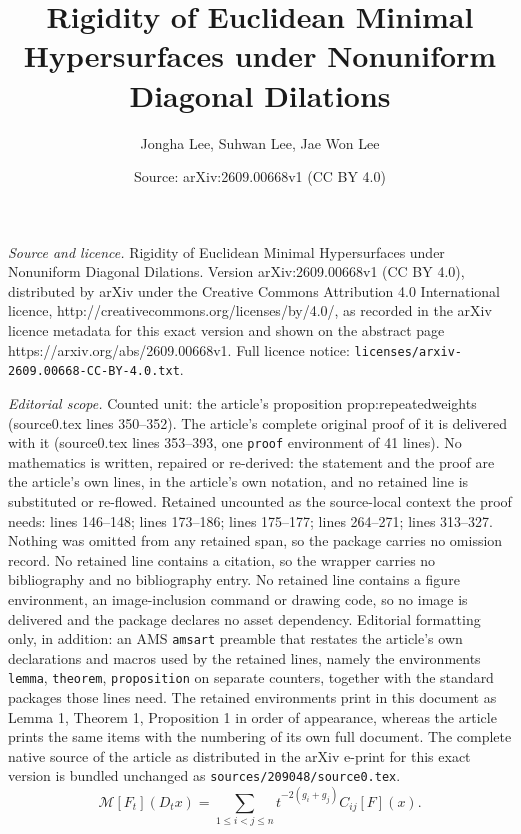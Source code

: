 \documentclass[10pt,a4paper]{amsart}
\title{Rigidity of Euclidean Minimal Hypersurfaces under Nonuniform Diagonal Dilations}
\author{Jongha Lee, Suhwan Lee, Jae Won Lee}
\date{Source: arXiv:2609.00668v1 (CC BY 4.0)}
\begin{document}
\maketitle

\noindent\emph{Source and licence.} Rigidity of Euclidean Minimal Hypersurfaces under Nonuniform Diagonal Dilations. Version arXiv:2609.00668v1 (CC BY 4.0), distributed by arXiv under the Creative Commons Attribution 4.0 International licence, http://creativecommons.org/licenses/by/4.0/, as recorded in the arXiv licence metadata for this exact version and shown on the abstract page https://arxiv.org/abs/2609.00668v1. Full licence notice: \texttt{licenses/arxiv-2609.00668-CC-BY-4.0.txt}.\par\smallskip

\noindent\textit{Editorial scope.} Counted unit: the article's proposition prop:repeatedweights (source0.tex lines 350--352). The article's complete original proof of it is delivered with it (source0.tex lines 353--393, one \texttt{proof} environment of 41 lines). No mathematics is written, repaired or re-derived: the statement and the proof are the article's own lines, in the article's own notation, and no retained line is substituted or re-flowed.  Retained uncounted as the source-local context the proof needs: lines 146--148; lines 173--186; lines 175--177; lines 264--271; lines 313--327.  Nothing was omitted from any retained span, so the package carries no omission record.  No retained line contains a citation, so the wrapper carries no bibliography and no bibliography entry.  No retained line contains a figure environment, an image-inclusion command or drawing code, so no image is delivered and the package declares no asset dependency.  Editorial formatting only, in addition: an AMS \texttt{amsart} preamble that restates the article's own declarations and macros used by the retained lines, namely the environments \texttt{lemma}, \texttt{theorem}, \texttt{proposition} on separate counters, together with the standard packages those lines need.  The retained environments print in this document as Lemma 1, Theorem 1, Proposition 1 in order of appearance, whereas the article prints the same items with the numbering of its own full document.  The complete native source of the article as distributed in the arXiv e-print for this exact version is bundled unchanged as \texttt{sources/209048/source0.tex}.
\begin{equation}\label{eq:dilationidentity}
\mathcal M[F_t](D_tx)=\sum_{1\le i<j\le n}t^{-2(g_i+g_j)}C_{ij}[F](x).
\end{equation}
\end{document}
